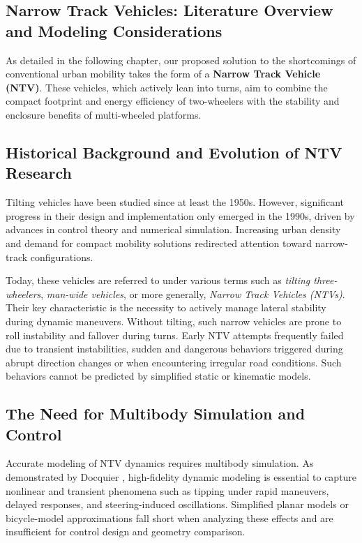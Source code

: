 \newpage

\subsection{Narrow Track Vehicles: Literature Overview and Modeling Considerations}

As detailed in the following chapter, our proposed solution to the shortcomings of conventional urban mobility takes the form of a \textbf{Narrow Track Vehicle (NTV)}. These vehicles, which actively lean into turns, aim to combine the compact footprint and energy efficiency of two-wheelers with the stability and enclosure benefits of multi-wheeled platforms.

\subsection*{Historical Background and Evolution of NTV Research}

Tilting vehicles have been studied since at least the 1950s. However, significant progress in their design and implementation only emerged in the 1990s, driven by advances in control theory and numerical simulation. Increasing urban density and demand for compact mobility solutions redirected attention toward narrow-track configurations.

Today, these vehicles are referred to under various terms such as \textit{tilting three-wheelers}, \textit{man-wide vehicles}, or more generally, \textit{Narrow Track Vehicles (NTVs)}. Their key characteristic is the necessity to actively manage lateral stability during dynamic maneuvers. Without tilting, such narrow vehicles are prone to roll instability and fallover during turns. Early NTV attempts frequently failed due to transient instabilities, sudden and dangerous behaviors triggered during abrupt direction changes or when encountering irregular road conditions. Such behaviors cannot be predicted by simplified static or kinematic models.

\subsection*{The Need for Multibody Simulation and Control}

Accurate modeling of NTV dynamics requires multibody simulation. As demonstrated by Docquier \cite{docquier_dynamic_nodate}, high-fidelity dynamic modeling is essential to capture nonlinear and transient phenomena such as tipping under rapid maneuvers, delayed responses, and steering-induced oscillations. Simplified planar models or bicycle-model approximations fall short when analyzing these effects and are insufficient for control design and geometry comparison.

